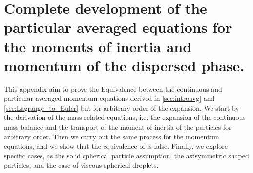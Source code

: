\chapter{Complete development of the particular averaged equations for the moments of inertia and momentum of the dispersed phase.}
\label{ap:exp}

This appendix aim to prove the Equivalence between the continuous and particular averaged momentum equations derived in \ref{sec:introavg} and \ref{sec:Lagrange_to_Euler} but for arbitrary order of the expansion.
We start by the derivation of the mass related equations, i.e. the expansion of the continuous mass balance and the transport of the moment of inertia of the particles for arbitrary order.
Then we carry out the same process for the momentum equations, and we show that the equivalence of \citet{nott2011suspension} is false.
Finally, we explore specific cases, as the solid spherical particle assumption, the axisymmetric shaped particles, and the case of viscous spherical droplets.


